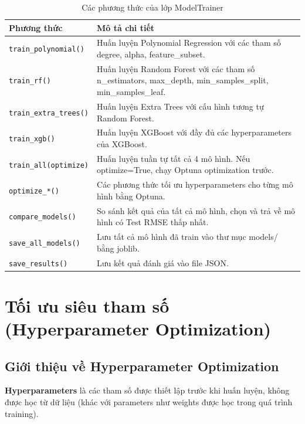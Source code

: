 \documentclass[12pt,a4paper]{article}
\begin{document}
\begin{table}[H]
\centering
\caption{Các phương thức của lớp ModelTrainer}
\label{tab:modeltrainer_methods}
\begin{tabular}{|p{4cm}|p{9.5cm}|}
\hline
\textbf{Phương thức} & \textbf{Mô tả chi tiết} \\
\hline
\texttt{train\_polynomial()} & Huấn luyện Polynomial Regression với các tham số degree, alpha, feature\_subset. \\
\hline
\texttt{train\_rf()} & Huấn luyện Random Forest với các tham số n\_estimators, max\_depth, min\_samples\_split, min\_samples\_leaf. \\
\hline
\texttt{train\_extra\_trees()} & Huấn luyện Extra Trees với cấu hình tương tự Random Forest. \\
\hline
\texttt{train\_xgb()} & Huấn luyện XGBoost với đầy đủ các hyperparameters của XGBoost. \\
\hline
\texttt{train\_all(optimize)} & Huấn luyện tuần tự tất cả 4 mô hình. Nếu optimize=True, chạy Optuna optimization trước. \\
\hline
\texttt{optimize\_*()} & Các phương thức tối ưu hyperparameters cho từng mô hình bằng Optuna. \\
\hline
\texttt{compare\_models()} & So sánh kết quả của tất cả mô hình, chọn và trả về mô hình có Test RMSE thấp nhất. \\
\hline
\texttt{save\_all\_models()} & Lưu tất cả mô hình đã train vào thư mục models/ bằng joblib. \\
\hline
\texttt{save\_results()} & Lưu kết quả đánh giá vào file JSON. \\
\hline
\end{tabular}
\end{table}

\section{Tối ưu siêu tham số (Hyperparameter Optimization)}

\subsection{Giới thiệu về Hyperparameter Optimization}

\textbf{Hyperparameters} là các tham số được thiết lập trước khi huấn luyện, không được học từ dữ liệu (khác với parameters như weights được học trong quá trình training).
\end{document}
